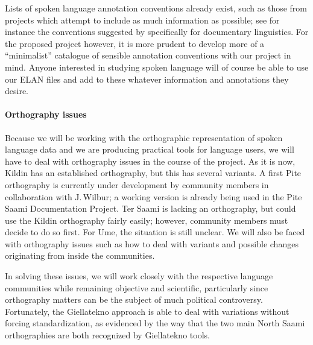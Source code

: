 \documentclass[a4paper,12pt]{article}
\begin{document}
Lists of spoken language annotation conventions already exist, such as those from projects which attempt to include as much information as possible; see for instance the conventions suggested by \citealt{schulze-bernd2006} specifically for documentary linguistics. For the proposed project however, it is more prudent to develop more of a “minimalist” catalogue of sensible annotation conventions with our project in mind. Anyone interested in studying spoken language will of course be able to use our ELAN files and add to these whatever information and annotations they desire.

\paragraph{Orthography issues}
Because we will be working with the orthographic representation of spoken language data and we are producing practical tools for language users, we will have to deal with orthography issues in the course of the project. As it is now, Kildin has an established orthography, but this has several variants. A first Pite orthography is currently under development by community members in collaboration with J.\,Wilbur; a working version is already being used in the Pite Saami Documentation Project. Ter Saami is lacking an orthography, but could use the Kildin orthography fairly easily; however, community members must decide to do so first. For Ume, the situation is still unclear. We will also be faced with orthography issues such as how to deal with variants and possible changes originating from inside the communities.

In solving these issues, we will work closely with the respective language communities while remaining objective and scientific, particularly since orthography matters can be the subject of much political controversy. Fortunately, the Giellatekno approach is able to deal with variations without forcing standardization, as evidenced by the way that the two main North Saami orthographies are both recognized by Giellatekno tools.
\end{document}
